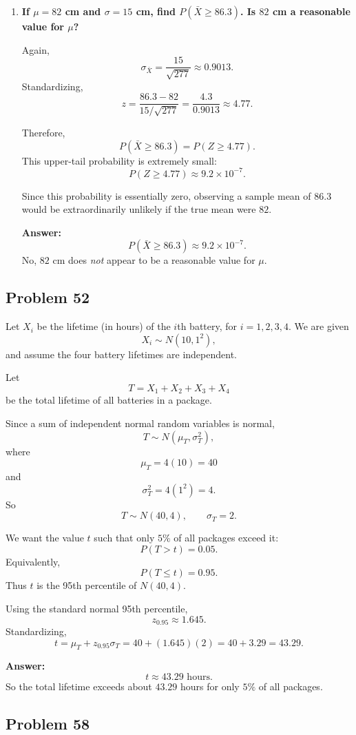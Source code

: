 \begin{enumerate}
    \item[(c)] \textbf{If $\mu=82$ cm and $\sigma=15$ cm, find $P(\bar{X}\ge 86.3)$. Is $82$ cm a reasonable value for $\mu$?}

    Again,
    \[
    \sigma_{\bar{X}}=\frac{15}{\sqrt{277}}\approx 0.9013.
    \]
    Standardizing,
    \[
    z=\frac{86.3-82}{15/\sqrt{277}}
    =\frac{4.3}{0.9013}\approx 4.77.
    \]

    Therefore,
    \[
    P(\bar{X}\ge 86.3)=P(Z\ge 4.77).
    \]
    This upper-tail probability is extremely small:
    \[
    P(Z\ge 4.77)\approx 9.2\times 10^{-7}.
    \]

    Since this probability is essentially zero, observing a sample mean of $86.3$ would be extraordinarily unlikely if the true mean were $82$.

    \textbf{Answer:}
    \[
    P(\bar{X}\ge 86.3)\approx 9.2\times 10^{-7}.
    \]
    No, $82$ cm does \emph{not} appear to be a reasonable value for $\mu$.
\end{enumerate}

\subsection*{Problem 52}

Let $X_i$ be the lifetime (in hours) of the $i$th battery, for $i=1,2,3,4$. We are given
\[
X_i \sim N(10,1^2),
\]
and assume the four battery lifetimes are independent.

Let
\[
T=X_1+X_2+X_3+X_4
\]
be the total lifetime of all batteries in a package.

Since a sum of independent normal random variables is normal,
\[
T \sim N(\mu_T,\sigma_T^2),
\]
where
\[
\mu_T=4(10)=40
\]
and
\[
\sigma_T^2=4(1^2)=4.
\]
So
\[
T\sim N(40,4), \qquad \sigma_T=2.
\]

We want the value $t$ such that only $5\%$ of all packages exceed it:
\[
P(T>t)=0.05.
\]
Equivalently,
\[
P(T\le t)=0.95.
\]
Thus $t$ is the 95th percentile of $N(40,4)$.

Using the standard normal 95th percentile,
\[
z_{0.95}\approx 1.645.
\]
Standardizing,
\[
t=\mu_T+z_{0.95}\sigma_T
=40+(1.645)(2)
=40+3.29
=43.29.
\]

\textbf{Answer:}
\[
t\approx 43.29 \text{ hours}.
\]
So the total lifetime exceeds about $43.29$ hours for only $5\%$ of all packages.

\subsection*{Problem 58}

